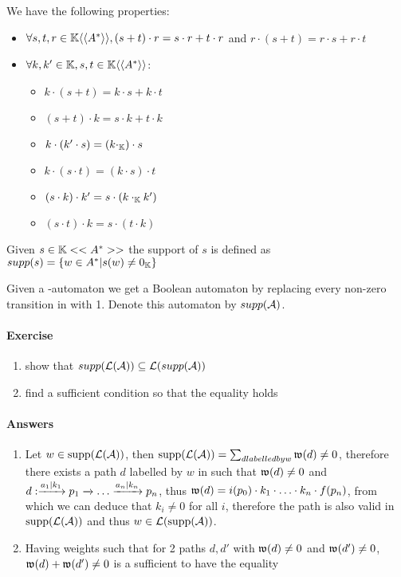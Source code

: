 We have the following properties:
\begin{itemize}
	\item $\forall s,t,r \in \mathbb{K}\langle\langle A^*\rangle\rangle, (s+t)\cdot r = s\cdot r + t \cdot r$
	and $r\cdot(s+t) = r\cdot s + r\cdot t$
	\item $\forall k, k' \in \mathbb{K}, s, t\in \mathbb{K}\langle\langle A^*\rangle\rangle$:
		\begin{itemize}
			\item $k\cdot(s+t) = k\cdot s + k\cdot t$
			\item $(s+t)\cdot k = s\cdot k + t \cdot k$
			\item $k\cdot(k'\cdot s) = (k\cdot_{\mathbb{K}})\cdot s$
			\item $k\cdot(s\cdot t) = (k\cdot s)\cdot t$
			\item $(s\cdot k)\cdot k' = s \cdot (k \cdot_{\mathbb{K}} k')$
			\item $(s \cdot t) \cdot k = s\cdot (t \cdot k)$
		\end{itemize}
\end{itemize}

\begin{definition}[support]
	Given $s\in \mathbb{K}<< A^*>>$ the support of $s$ is defined as
	$supp(s) = \{w \in A^* | s(w) \neq 0_{\mathbb{K}}\}$
\end{definition}

Given a \KK-automaton \Aut{} we get a Boolean automaton by replacing every
non-zero transition in \Aut{} with 1. Denote this automaton by $supp(\mathcal{A})$.

\paragraph{Exercise} 
\begin{enumerate}
	\item show that $supp(\mathcal{L}(\mathcal{A})) \subseteq \mathcal{L}(supp(\mathcal{A}))$
	\item find a sufficient condition so that the equality holds
\end{enumerate}
\paragraph{Answers}
\begin{enumerate}
	\item Let $w \in \operatorname{supp}(\mathcal{L}(\mathcal{A}))$, then
		$\operatorname{supp}(\mathcal{L}(\mathcal{A})) = \sum_{d labelled by w} \operatorname{\mathfrak{w}}(d) \neq 0$,
		therefore there exists a path $d$ labelled by $w$ in \Aut{}
		such that $\operatorname{\mathfrak{w}}(d) \neq 0$ and $d:\xrightarrow{a_{1}|k_{1}}p_{1}
		\xrightarrow{}\ldots\xrightarrow{a_{n}|k_{n}}p_{n}$, thus
		$\operatorname{\mathfrak{w}}(d) = i(p_{0}) \cdot k_{1}\cdot \ldots \cdot k_{n}\cdot 
		f(p_{n})$, from which we can deduce that $k_{i} \neq 0$ for all $i$,
		therefore the path is also valid in $\operatorname{supp}(\mathcal{L}(\mathcal{A}))$ and
		thus $w \in \mathcal{L}(\operatorname{supp}(\mathcal{A}))$.
	\item Having weights such that for 2 paths $d, d'$ with
		$\operatorname{\mathfrak{w}}(d) \neq 0$ and $\operatorname{\mathfrak{w}}(d') \neq 0$, $\operatorname{\mathfrak{w}}(d) +
		\operatorname{\mathfrak{w}}(d') \neq 0$ is a sufficient to have the equality
\end{enumerate}

